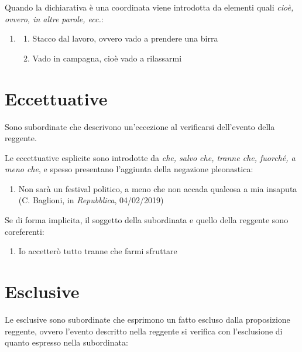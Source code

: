 \documentclass[
  a4paper,
  twoside,
  11pt,
  chapterprefix=false,
  bibliography=totocnumbered,
  listof=flat]{scrbook}
\providecommand{\tightlist}{%
  \setlength{\itemsep}{0pt}\setlength{\parskip}{0pt}}
\begin{document}
Quando la dichiarativa è una coordinata viene introdotta da elementi quali \emph{cioè, ovvero, in altre parole, ecc.}:

\begin{enumerate}
\def\labelenumi{(\arabic{enumi})}
\setcounter{enumi}{96}
\item
  \begin{enumerate}
  \def\labelenumii{\alph{enumii}.}
  \tightlist
  \item
    Stacco dal lavoro, ovvero vado a prendere una birra
  \item
    Vado in campagna, cioè vado a rilassarmi
  \end{enumerate}
\end{enumerate}

\hypertarget{eccettuative}{%
\section{Eccettuative}\label{eccettuative}}

Sono subordinate che descrivono un'eccezione al verificarsi dell'evento della reggente.

Le eccettuative esplicite sono introdotte da \emph{che, salvo che, tranne che, fuorché, a meno che}, e spesso presentano l'aggiunta della negazione pleonastica:

\begin{enumerate}
\def\labelenumi{(\arabic{enumi})}
\setcounter{enumi}{97}
\tightlist
\item
  Non sarà un festival politico, a meno che non accada qualcosa a mia insaputa (C. Baglioni, in \emph{Repubblica}, 04/02/2019)
\end{enumerate}

Se di forma implicita, il soggetto della subordinata e quello della reggente sono coreferenti:

\begin{enumerate}
\def\labelenumi{(\arabic{enumi})}
\setcounter{enumi}{98}
\tightlist
\item
  Io accetterò tutto tranne che farmi sfruttare
\end{enumerate}

\hypertarget{esclusive}{%
\section{Esclusive}\label{esclusive}}

Le esclusive sono subordinate che esprimono un fatto escluso dalla proposizione reggente, ovvero l'evento descritto nella reggente si verifica con l'esclusione di quanto espresso nella subordinata:
\end{document}
